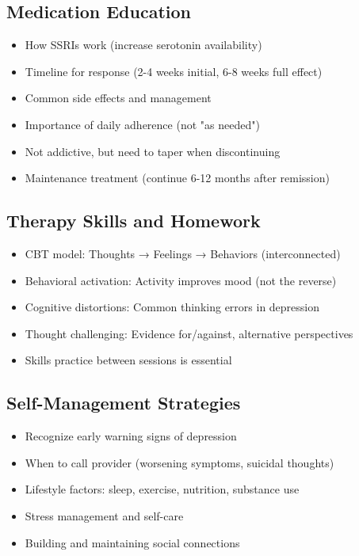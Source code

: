 \documentclass[11pt,letterpaper]{article}
\begin{document}
\subsection*{Medication Education}

\begin{itemize}[leftmargin=*]
    \item How SSRIs work (increase serotonin availability)
    \item Timeline for response (2-4 weeks initial, 6-8 weeks full effect)
    \item Common side effects and management
    \item Importance of daily adherence (not "as needed")
    \item Not addictive, but need to taper when discontinuing
    \item Maintenance treatment (continue 6-12 months after remission)
\end{itemize}

\subsection*{Therapy Skills and Homework}

\begin{itemize}[leftmargin=*]
    \item CBT model: Thoughts → Feelings → Behaviors (interconnected)
    \item Behavioral activation: Activity improves mood (not the reverse)
    \item Cognitive distortions: Common thinking errors in depression
    \item Thought challenging: Evidence for/against, alternative perspectives
    \item Skills practice between sessions is essential
\end{itemize}

\subsection*{Self-Management Strategies}

\begin{itemize}[leftmargin=*]
    \item Recognize early warning signs of depression
    \item When to call provider (worsening symptoms, suicidal thoughts)
    \item Lifestyle factors: sleep, exercise, nutrition, substance use
    \item Stress management and self-care
    \item Building and maintaining social connections
\end{itemize}
\end{document}
